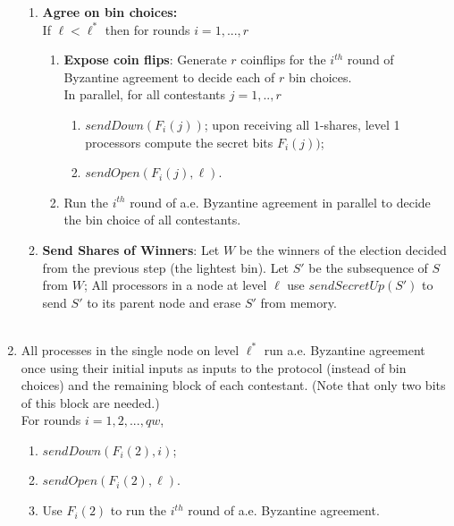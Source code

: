 \documentclass[letterpaper,11pt]{article}
\begin{document}
\begin{algorithm}
\begin{enumerate}
\begin{enumerate}
\item {\bf Agree on bin choices:}\\
If $\ell <\ell^*$ then for rounds  $i=1,...,r$ \\
\begin{enumerate}
\item
{\bf Expose coin flips}: Generate $r$ coinflips for the $i^{th}$ round of Byzantine agreement to decide each of $r$ bin choices.\\
In parallel,  for all contestants $j=1,..,r$ 
\begin{enumerate}
\item
$sendDown(F_i(j))$; upon receiving all $1$-shares, level 1 processors compute the secret bits $F_i(j))$;
\item
 $sendOpen(F_i(j), \ell)$.
\end{enumerate}
\item
Run the $i^{th}$ round of a.e. Byzantine agreement in parallel to decide the bin choice of all contestants. \\
\end{enumerate}

\item {\bf Send Shares of Winners}: 
Let $W$ be the winners of the election decided from the previous step (the lightest bin).  Let $S'$ be the subsequence of $S$ from $W$;   All processors in a node at level $\ell$ use $sendSecretUp(S')$ to  send $S'$ to its parent node
and erase $S'$ from memory. \\
   \\
\end{enumerate}
\item
All  processes in the single node on level $\ell^*$ run a.e. Byzantine agreement once using their initial inputs  as inputs to the protocol  (instead of bin choices) and the remaining block of each contestant. (Note that only two bits of  this block are needed.) \\
For rounds $i = 1, 2,..., qw$, 

 \begin{enumerate}
\item
 $sendDown(F_i(2),i)$;

 \item
 $sendOpen(F_i(2), \ell)$. 
\item
Use $F_i(2)$ to run the $i^{th}$ round of a.e. Byzantine agreement. 
\end{enumerate}


\end{enumerate}
\end{algorithm}
\end{document}
